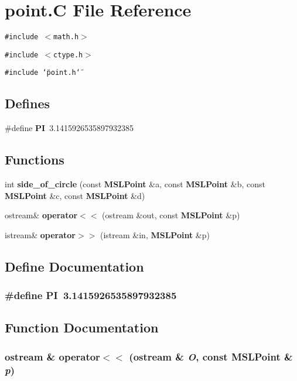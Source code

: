 \section{point.C File Reference}
\label{point_8C}
{\tt \#include $<$math.h$>$}\par
{\tt \#include $<$ctype.h$>$}\par
{\tt \#include \char`\"{}point.h\char`\"{}}\par
\subsection*{Defines}
\begin{CompactItemize}
\item 
\#define {\bf PI}\ 3.1415926535897932385
\end{CompactItemize}
\subsection*{Functions}
\begin{CompactItemize}
\item 
int {\bf side\_\-of\_\-circle} (const {\bf MSLPoint} \&a, const {\bf MSLPoint} \&b, const {\bf MSLPoint} \&c, const {\bf MSLPoint} \&d)
\item 
ostream\& {\bf operator$<$$<$} (ostream \&out, const {\bf MSLPoint} \&p)
\item 
istream\& {\bf operator$>$$>$} (istream \&in, {\bf MSLPoint} \&p)
\end{CompactItemize}


\subsection{Define Documentation}
\subsubsection{\setlength{\rightskip}{0pt plus 5cm}\#define PI\ 3.1415926535897932385}\label{point_8C_a0}




\subsection{Function Documentation}
\subsubsection{\setlength{\rightskip}{0pt plus 5cm}ostream \& operator$<$$<$ (ostream \& {\em O}, const {\bf MSLPoint} \& {\em p})}\label{point_8C_a2}


